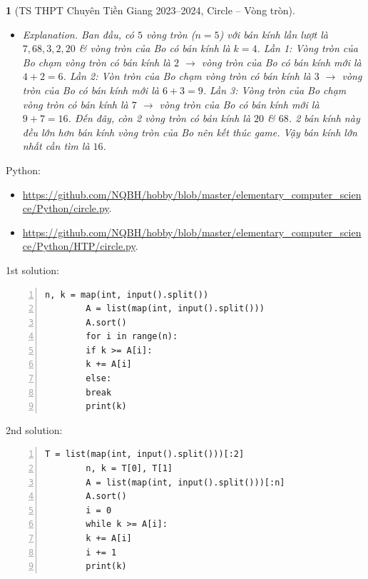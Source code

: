 \documentclass{article}
\newtheorem{baitoan}{}
\begin{document}
\begin{baitoan}[TS THPT Chuyên Tiền Giang 2023--2024, Circle -- Vòng tròn]
\begin{itemize}
		\item {\sf Explanation.} Ban đầu, có $5$ vòng tròn ($n = 5$) với bán kính lần lượt là $7,68,3,2,20$ \& vòng tròn của Bo có bán kính là $k = 4$. Lần 1: Vòng tròn của Bo chạm vòng tròn có bán kính là $2$ $\to$ vòng tròn của Bo có bán kính mới là $4 + 2 = 6$. Lần 2: Vòn tròn của Bo chạm vòng tròn có bán kính là $3$ $\to$ vòng tròn của Bo có bán kính mới là $6 + 3 = 9$. Lần 3: Vòng tròn của Bo chạm vòng tròn có bán kính là $7$ $\to$ vòng tròn của Bo có bán kính mới là $9 + 7 = 16$. Đến đây, còn 2 vòng tròn có bán kính là $20$ \& $68$. 2 bán kính này đều lớn hơn bán kính vòng tròn của Bo nên kết thúc game. Vậy bán kính lớn nhất cần tìm là $16$.
	\end{itemize}
\end{baitoan}
Python:
\begin{itemize}
	\item \url{https://github.com/NQBH/hobby/blob/master/elementary_computer_science/Python/circle.py}.
	\item \url{https://github.com/NQBH/hobby/blob/master/elementary_computer_science/Python/HTP/circle.py}.
\end{itemize}

\begin{multicols}{2}
	1st solution:
	\begin{Verbatim}[numbers=left,xleftmargin=5mm]
		n, k = map(int, input().split())
		A = list(map(int, input().split()))
		A.sort()
		for i in range(n):
		if k >= A[i]:
		k += A[i]
		else:
		break
		print(k)
	\end{Verbatim}
	\columnbreak
	2nd solution:
	\begin{Verbatim}[numbers=left,xleftmargin=5mm]
		T = list(map(int, input().split()))[:2]
		n, k = T[0], T[1]
		A = list(map(int, input().split()))[:n]
		A.sort()
		i = 0
		while k >= A[i]:
		k += A[i]
		i += 1
		print(k)
	\end{Verbatim}
\end{multicols}
\end{document}
